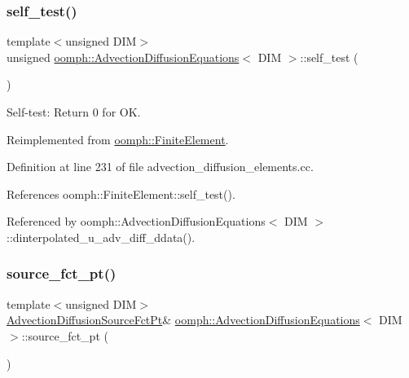 \subsubsection{\texorpdfstring{self\+\_\+test()}{self\_test()}}
{\footnotesize\ttfamily template$<$unsigned D\+IM$>$ \\
unsigned \hyperlink{classoomph_1_1AdvectionDiffusionEquations}{oomph\+::\+Advection\+Diffusion\+Equations}$<$ D\+IM $>$\+::self\+\_\+test (\begin{DoxyParamCaption}{ }\end{DoxyParamCaption})\hspace{0.3cm}{\ttfamily [virtual]}}



Self-\/test\+: Return 0 for OK. 



Reimplemented from \hyperlink{classoomph_1_1FiniteElement_af94c5a5e22175d5420b33b3b79e46ed3}{oomph\+::\+Finite\+Element}.



Definition at line 231 of file advection\+\_\+diffusion\+\_\+elements.\+cc.



References oomph\+::\+Finite\+Element\+::self\+\_\+test().



Referenced by oomph\+::\+Advection\+Diffusion\+Equations$<$ D\+I\+M $>$\+::dinterpolated\+\_\+u\+\_\+adv\+\_\+diff\+\_\+ddata().

\mbox{\label{classoomph_1_1AdvectionDiffusionEquations_af760c608d973514288373c11a4180002}} 
\subsubsection{\texorpdfstring{source\+\_\+fct\+\_\+pt()}{source\_fct\_pt()}\hspace{0.1cm}{\footnotesize\ttfamily [1/2]}}
{\footnotesize\ttfamily template$<$unsigned D\+IM$>$ \\
\hyperlink{classoomph_1_1AdvectionDiffusionEquations_aa892578e0cffe209775da9f5ac84bd03}{Advection\+Diffusion\+Source\+Fct\+Pt}\& \hyperlink{classoomph_1_1AdvectionDiffusionEquations}{oomph\+::\+Advection\+Diffusion\+Equations}$<$ D\+IM $>$\+::source\+\_\+fct\+\_\+pt (\begin{DoxyParamCaption}{ }\end{DoxyParamCaption})\hspace{0.3cm}{\ttfamily [inline]}}



